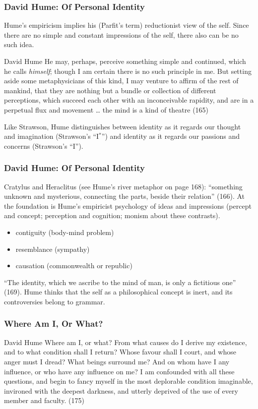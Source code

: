 \documentclass[xcolor=dvipsnames]{beamer}
\begin{document}
\begin{frame}
  \frametitle{David Hume: Of Personal Identity}
  Hume's empiricism implies his (Parfit's term) reductionist view
  of the self. Since there are no simple and constant impressions
  of the self, there also can be no such idea.
  \begin{block}{David Hume}
    He may, perhaps, perceive something simple and continued,
    which he calls \emph{himself}; though I am certain there is no
    such principle in me. But setting aside some metaphysicians of
    this kind, I may venture to affirm of the rest of mankind,
    that they are nothing but a bundle or collection of different
    perceptions, which succeed each other with an inconceivable
    rapidity, and are in a perpetual flux and movement {\ldots}
    the mind is a kind of theatre (165)
  \end{block}
Like Strawson, Hume distinguishes between identity as it regards
our thought and imagination (Strawson's ``I$^{\ast}$'') and identity
as it regards our passions and concerns (Strawson's ``I''). 
\end{frame}

\begin{frame}
  \frametitle{David Hume: Of Personal Identity}
  Cratylus and Heraclitus (see Hume's river metaphor on page 168):
  ``something unknown and mysterious, connecting the parts, beside
  their relation'' (166). At the foundation is Hume's empiricist
  psychology of ideas and impressions (percept and concept;
  perception and cognition; monism about these contrasts).
  \begin{itemize}
  \item contiguity (body-mind problem)
  \item resemblance (sympathy)
  \item causation (commonwealth or republic)
  \end{itemize}
  ``The identity, which we ascribe to the mind of man, is only a
  fictitious one'' (169). Hume thinks that the self as a
  philosophical concept is inert, and its controversies belong to
  grammar.
\end{frame}

\begin{frame}
  \frametitle{Where Am I, Or What?}
  \begin{block}{David Hume}
    Where am I, or what? From what causes do I derive my
    existence, and to what condition shall I return? Whose favour
    shall I court, and whose anger must I dread? What beings
    surround me? And on whom have I any influence, or who have
    any influence on me? I am confounded with all these questions,
    and begin to fancy myself in the most deplorable condition
    imaginable, invironed with the deepest darkness, and utterly
    deprived of the use of every member and faculty. (175)
  \end{block}
\end{frame}
\end{document}
